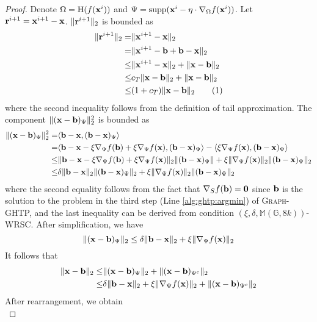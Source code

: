 \documentclass{article}
\newcommand\numberthis{\addtocounter{equation}{1}\tag{\theequation}}
\begin{document}
\begin{proof}
Denote $\Omega=\mathrm{H}(f({\bf x}^i))$ and $\Psi=\mathrm{supp}({\bf x}^i-\eta\cdot\nabla_{\Omega}f({\bf x}^i))$. Let ${\bf r}^{i+1}={\bf x}^{i+1}-{\bf x}$. $\|{\bf r}^{i+1}\|_2$ is bounded as
\begin{align*}
\|{\bf r}^{i+1}\|_2=&\|{\bf x}^{i+1}-{\bf x}\|_2\\
=&\|{\bf x}^{i+1}-{\bf b}+{\bf b}-{\bf x}\|_2\\
\leq&\|{\bf x}^{i+1}-{\bf x}\|_2+\|{\bf x}-{\bf b}\|_2\\
\leq&c_T\|{\bf x}-{\bf b}\|_2+\|{\bf x}-{\bf b}\|_2\\
\leq&(1+c_T)\|{\bf x}-{\bf b}\|_2\numberthis\label{eq:ghtp:proof:rip1}
\end{align*}
where the second inequality follows from the definition of tail approximation. The component $\|({\bf x}-{\bf b})_{\Psi}\|_2^2$ is bounded as
\begin{align*}
\|({\bf x}-{\bf b})_{\Psi}\|_2^2=&\langle{\bf b}-{\bf x},({\bf b}-{\bf x})_{\Psi} \rangle\\
=&\langle{\bf b}-{\bf x}-\xi\nabla_{\Psi}f({\bf b})+\xi\nabla_{\Psi}f({\bf x}), ({\bf b}-{\bf x})_{\Psi}\rangle-\langle\xi\nabla_{\Psi}f({\bf x}),({\bf b}-{\bf x})_{\Psi} \rangle\\
\leq&\|{\bf b}-{\bf x}-\xi\nabla_{\Psi}f({\bf b})+\xi\nabla_{\Psi}f({\bf x})\|_2\|({\bf b}-{\bf x})_{\Psi}\|+\xi\|\nabla_{\Psi}f({\bf x})\|_2\|({\bf b}-{\bf x})_{\Psi}\|_2\\
\leq&\delta\|{\bf b}-{\bf x}\|_2\|({\bf b}-{\bf x})_{\Psi}\|_2+\xi\|\nabla_{\Psi}f({\bf x})\|_2\|({\bf b}-{\bf x})_{\Psi}\|_2
\end{align*}
where the second equality follows from the fact that $\nabla_S f({\bf b})={\bf 0}$ since ${\bf b}$ is the solution to the problem in the third step (Line \ref{alg:ghtp:argmin}) of \textsc{Graph}-GHTP, and the last inequality can be derived from condition $(\xi,\delta,\mathbb{M}(\mathbb{G},8k))$-WRSC. After simplification, we have
\[
\|({\bf x}-{\bf b})_{\Psi}\|_2\leq\delta\|{\bf b}-{\bf x}\|_2+\xi\|\nabla_{\Psi}f({\bf x})\|_2
\]
It follows that
\begin{align*}
\|{\bf x}-{\bf b}\|_2\leq&\|({\bf x}-{\bf b})_{\Psi}\|_2+\|({\bf x}-{\bf b})_{\Psi^c}\|_2\\
\leq&\delta\|{\bf b}-{\bf x}\|_2+\xi\|\nabla_{\Psi}f({\bf x})\|_2+\|({\bf x}-{\bf b})_{\Psi^c}\|_2
\end{align*}
After rearrangement, we obtain
\begin{equation}\label{eq:ghtp:proof:xmb}

\end{equation}
\end{proof}
\end{document}
